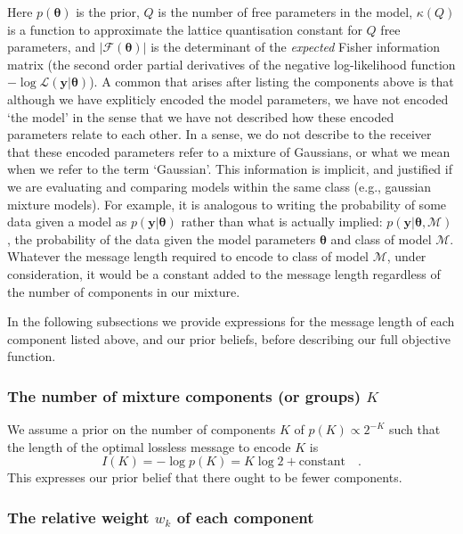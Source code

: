 \documentclass{elsarticle}
\newcommand{\vect}[1]{\boldsymbol{\mathbf{#1}}}
\renewcommand{\vec}[1]{\vect{#1}}
\def\datum{y}
\def\data{\vect{\datum}}
\def\likelihood{\mathcal{L}}
\newcommand{\fisher}[1]{\mathcal{F}\left(#1\right)}
\newcommand{\prior}[1]{p\left(#1\right)}
\begin{document}
Here $\prior{\vec{\theta}}$ is the prior, $Q$ is the number of free parameters
in the model, $\kappa(Q)$ is a function to approximate the lattice quantisation
constant for $Q$ free parameters\cite{ConwaySloane1984}, and $|\fisher{\vec{\theta}}|$
is the determinant of the \emph{expected} Fisher information matrix (the second
order partial derivatives of the negative log-likelihood function $-\log\likelihood\left(\vec{\data}|\vec{\theta}\right)$).
A common that arises after listing the components above is that although we
have expliticly encoded the model parameters, we have not encoded `the model'
in the sense that we have not described how these encoded parameters relate 
to each other. In a sense, we do not describe to the receiver that these
encoded parameters refer to a mixture of Gaussians, or what we mean when we
refer to the term `Gaussian'. This information is implicit, and justified
if we are evaluating and comparing models within the same class (e.g., gaussian 
mixture models). For example, it is analogous to writing the probability of
some data given a model as $p(\vec{\data}|\vec{\theta})$ rather than what is 
actually implied: $p(\vec{\data}|\vec{\theta},\vec{\mathcal{M}})$, the 
probability of the data given the model parameters $\vec{\theta}$ and class of 
model $\vec{\mathcal{M}}$. Whatever the message length required to encode to 
class of model $\vec{\mathcal{M}}$, under consideration, it would be a constant 
added to the message length regardless of the number of components in our mixture. 

In the following subsections we provide expressions for the message length of
each component listed above, and our prior beliefs, before describing our
full objective function.

\subsubsection{The number of mixture components (or groups) $K$}

We assume a prior on the number of components $K$ of $\prior{K} \propto 2^{-K}$
\cite[][p279, sec. 6.8.2]{Wallace05} such that the length of the 
optimal lossless message to encode $K$ is 
\begin{equation}
    I(K) = -\log{\prior{K}} = K\log{2} + \textrm{constant} \quad .
\end{equation}
This  expresses our prior belief that there ought to be fewer components.



\subsubsection{The relative weight $w_k$ of each component}
\end{document}
